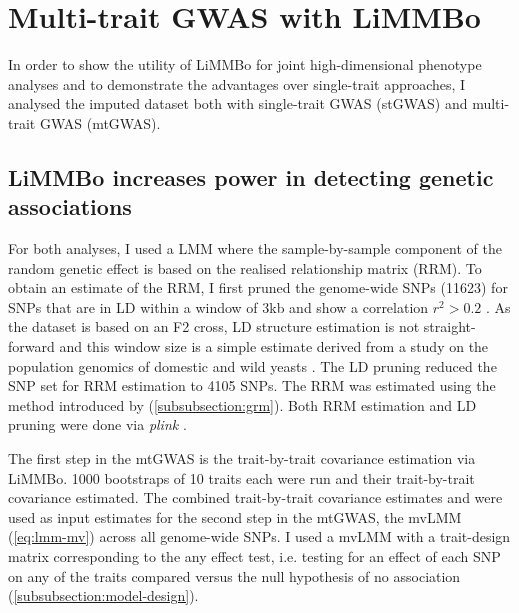 \newpage
\section{Multi-trait GWAS with LiMMBo}
In order to show the utility of LiMMBo for joint high-dimensional phenotype analyses and to demonstrate the advantages over single-trait approaches, I analysed the imputed dataset both with single-trait GWAS (stGWAS) and multi-trait GWAS (mtGWAS). 

\subsection{LiMMBo increases power in detecting genetic associations}
\label{subsection:power-yeast}
For both analyses, I used a LMM where the sample-by-sample component of the random genetic effect is based on the  realised relationship matrix (RRM). To obtain an estimate of the RRM, I first pruned the genome-wide SNPs (\num{11623}) for SNPs that are in LD within a window of 3kb and show a correlation \(r^2 > 0.2\) . As the dataset is based on an F2 cross, LD structure estimation is not straight-forward and this window size is a simple estimate derived from a study on the population genomics of domestic and wild yeasts \citep{Liti2009}. The LD pruning reduced the SNP set for RRM estimation to \num{4105} SNPs. The RRM was estimated using the method introduced by \citet{Yang2011} (\cref{subsubsection:grm}). Both RRM estimation and LD pruning were done via \textit{plink} \citep{Chang2015}.

The first step in the mtGWAS is the trait-by-trait covariance estimation via LiMMBo. \num{1000} bootstraps of \num{10} traits each were run and their trait-by-trait covariance estimated. The combined trait-by-trait covariance estimates  and  were used as input estimates for the second step in the mtGWAS, the mvLMM  (\cref{eq:lmm-mv}) across all genome-wide SNPs. I used a mvLMM with a trait-design matrix corresponding to the any effect test, i.e. testing for an effect of each SNP on any of the traits compared versus the null hypothesis of no association (\cref{subsubsection:model-design}).

